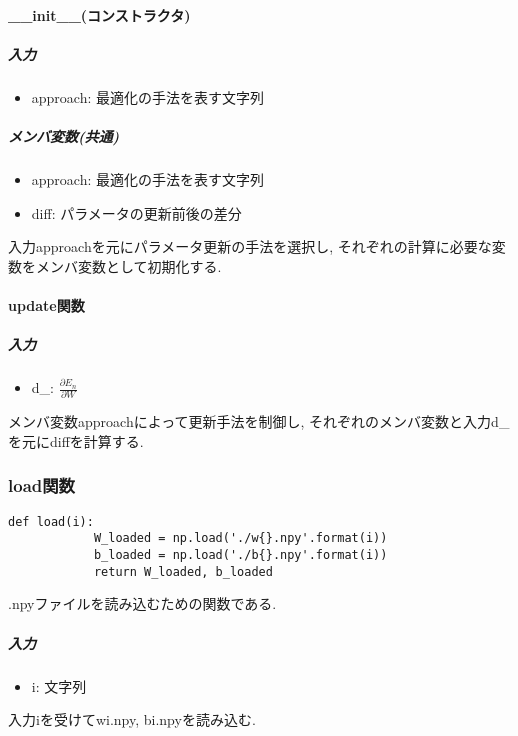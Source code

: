 \documentclass[a4j, titlepage]{jarticle}
\begin{document}
        \paragraph*{\_\_init\_\_(コンストラクタ)}
            \subparagraph*{入力}
            \begin{itemize}
                \item approach: 最適化の手法を表す文字列
            \end{itemize}
            \subparagraph*{メンバ変数(共通)}
            \begin{itemize}
                \item approach: 最適化の手法を表す文字列
                \item diff: パラメータの更新前後の差分
            \end{itemize}
            入力approachを元にパラメータ更新の手法を選択し, それぞれの計算に必要な変数をメンバ変数として初期化する.
        \paragraph*{update関数}
            \subparagraph*{入力}
            \begin{itemize}
                \item d\_: \(\displaystyle \frac{\partial E_n}{\partial W}\)
            \end{itemize}
            メンバ変数approachによって更新手法を制御し, それぞれのメンバ変数と入力d\_を元にdiffを計算する.


    \subsubsection{load関数}
        \begin{lstlisting}[caption=Wとbの.npyファイルを読み込み,label=fuga]
        def load(i):
            W_loaded = np.load('./w{}.npy'.format(i))
            b_loaded = np.load('./b{}.npy'.format(i))
            return W_loaded, b_loaded
        \end{lstlisting}
        .npyファイルを読み込むための関数である.
            \subparagraph*{入力}
            \begin{itemize}
                \item i: 文字列
            \end{itemize}
            入力iを受けてwi.npy, bi.npyを読み込む.
\end{document}
